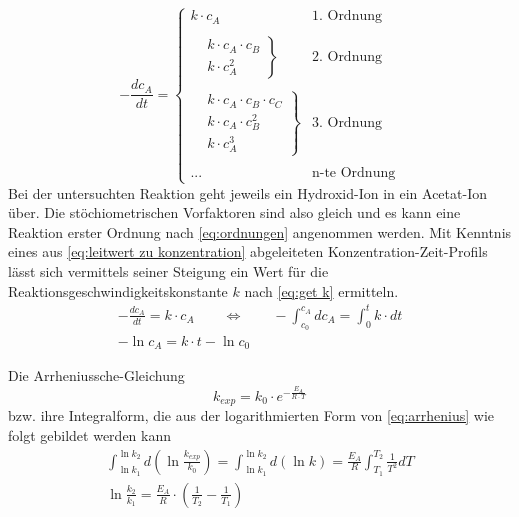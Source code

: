 	\begin{equation}
		-\frac{dc_A}{dt} =
		\begin{cases}
			k \cdot c_A & \text{1. Ordnung} \\
			\\
			\left.
			\begin{aligned}
				&k \cdot c_A \cdot c_B \\
				&k \cdot c_A^2
			\end{aligned}\right\} &\text{2. Ordnung} \\
			\\
			\left.
			\begin{aligned}
				&k \cdot c_A \cdot c_B \cdot c_C \\
				&k \cdot c_A \cdot c_B^2 \\
				&k \cdot c_A^3
			\end{aligned}\right\} &\text{3. Ordnung} \\ 
			\\
			... & \text{n-te Ordnung}
		\end{cases}
		\label{eq:ordnungen}
	\end{equation}
	Bei der untersuchten Reaktion geht jeweils ein Hydroxid-Ion in ein Acetat-Ion über. Die stöchiometrischen Vorfaktoren sind also
	gleich und es kann eine Reaktion erster Ordnung nach \cref{eq:ordnungen} angenommen werden. Mit Kenntnis eines aus \cref{eq:leitwert zu konzentration}
	abgeleiteten Konzentration-Zeit-Profils lässt sich vermittels seiner Steigung ein Wert für die Reaktionsgeschwindigkeitskonstante \(k\)
	nach \cref{eq:get k} ermitteln.
	\begin{gather}
		-\frac{dc_A}{dt} = k \cdot c_A \qquad \Leftrightarrow \qquad -\int_{c_0}^{c_A} dc_A = \int_{0}^t k \cdot dt \nonumber \\
		-\ln{c_A} = k \cdot t - \ln{c_0}
		\label{eq:get k}
	\end{gather}\par\medskip
	Die Arrheniussche-Gleichung \cite{Einstieg.in.die.Physikalische.Chemie.fuer.Nebenfaechler.Bechmann.2016}
	\begin{equation}
		k_{exp} = k_0 \cdot e^{-\frac{E_A}{R \cdot T}}
		\label{eq:arrhenius}
	\end{equation}
	bzw. ihre Integralform, die aus der logarithmierten Form von \cref{eq:arrhenius} wie folgt gebildet werden kann
	\begin{gather}
		\int_{\ln{k_1}}^{\ln{k_2}} d\left(\ln{\frac{k_{exp}}{k_0}}\right) = \int_{\ln{k_1}}^{\ln{k_2}} d(\ln{k}) = \frac{E_A}{R} \int_{T_1}^{T_2} \frac{1}{T^2} dT \nonumber \\
		\ln{\frac{k_2}{k_1}} = \frac{E_A}{R} \cdot \left(\frac{1}{T_2} - \frac{1}{T_1}\right)
		\label{eq:arrhenius integralform}
	\end{gather}
